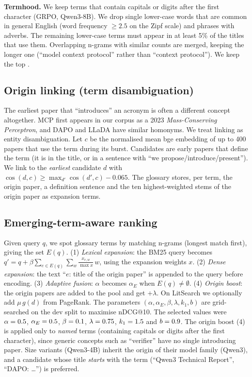 \documentclass[10pt,twocolumn]{article}
\begin{document}
\textbf{Termhood.} We keep terms that contain capitals or digits after the first
character (GRPO, Qwen3-8B). We drop single lower-case words that are common in
general English (word frequency $\geq 2.5$ on the Zipf scale) and phrases with
adverbs. The remaining lower-case terms must appear in at least 5\% of the titles
that use them. Overlapping n-grams with similar counts are merged, keeping the
longer one (``model context protocol'' rather than ``context protocol''). We keep
the top \NGloss{}.

\subsection{Origin linking (term disambiguation)}
The earliest paper that ``introduces'' an acronym is often a different concept
altogether. MCP first appears in our corpus as a 2023 \emph{Mass-Conserving
Perceptron}, and DAPO and LLaDA have similar homonyms. We treat linking as entity
disambiguation. Let $c$ be the normalised mean bge embedding of up to 400 papers
that use the term during its burst. Candidates are early papers that define the term
(it is in the title, or in a sentence with ``we propose/introduce/present''). We link
to the \emph{earliest} candidate $d$ with $\cos(d,c)\geq\max_{d'}\cos(d',c)-0.065$.
The glossary stores, per term, the origin paper, a definition sentence and the ten
highest-weighted stems of the origin paper as expansion terms.

\subsection{Emerging-term-aware ranking}
Given query $q$, we spot glossary terms by matching n-grams (longest match first),
giving the set $E(q)$.
(1) \emph{Lexical expansion}: the BM25 query becomes
$q'=q+\beta\sum_{e\in E(q)}\sum_{w}\frac{x_{e,w}}{\max x}\,w$, using the expansion
weights $x$.
(2) \emph{Dense expansion}: the text ``$e$: title of the origin paper'' is appended
to the query before encoding.
(3) \emph{Adaptive fusion}: $\alpha$ becomes $\alpha_E$ when $E(q)\neq\emptyset$.
(4) \emph{Origin boost}: the origin papers are added to the pool and get $+\lambda$.
On LitSearch we optionally add $\mu\,g(d)$ from PageRank. The parameters
$(\alpha,\alpha_E,\beta,\lambda,k_1,b)$ are grid-searched on the dev split to
maximise nDCG@10. The selected values were $\alpha=0.5$,
$\alpha_E=0.5$, $\beta=0.1$, $\lambda=0.75$, $k_1=1.5$ and
$b=0.9$. The origin boost (4) is applied only to \emph{named} terms (containing
capitals or digits after the first character), since generic concepts such as
``verifier'' have no single introducing paper. Size variants (Qwen3-4B) inherit the
origin of their model family (Qwen3), and a candidate whose title \emph{starts} with
the term (``Qwen3 Technical Report'', ``DAPO: \ldots'') is preferred.
\end{document}
